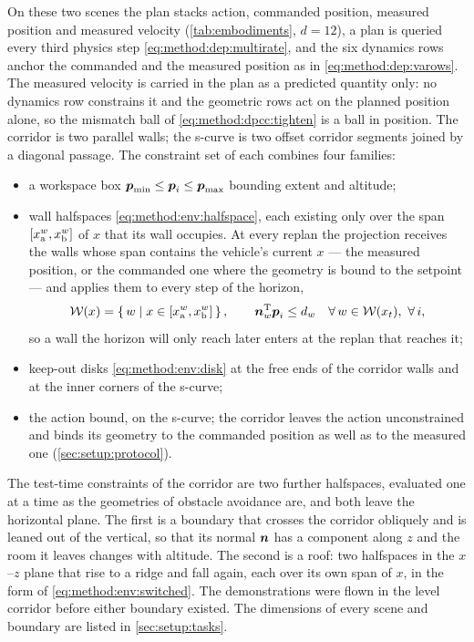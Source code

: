 On these two scenes the plan stacks action, commanded position, measured position and measured velocity
(\autoref{tab:embodiments}, $d = 12$), a plan is queried every third physics step
\eqref{eq:method:dep:multirate}, and the six dynamics rows anchor the commanded and the measured position
as in \eqref{eq:method:dep:varows}. The measured velocity is carried in the plan as a predicted quantity only:
no dynamics row constrains it and the geometric rows act on the planned position alone, so the mismatch ball of
\eqref{eq:method:dpcc:tighten} is a ball in position. The corridor is two parallel walls; the s-curve is two offset corridor
segments joined by a diagonal passage. The constraint set of each combines four families:
\begin{itemize}
  \item a workspace box $\boldsymbol{p}_{\textrm{min}}\le\boldsymbol{p}_{i}\le\boldsymbol{p}_{\textrm{max}}$ bounding extent and
    altitude;
  \item wall halfspaces \eqref{eq:method:env:halfspace}, each existing only over the span
    $[x_{\textrm{a}}^{w},x_{\textrm{b}}^{w}]$ of $x$ that its wall occupies. At every replan the projection receives
    the walls whose span contains the vehicle's current $x$ --- the measured position, or the commanded one
    where the geometry is bound to the setpoint --- and applies them to every step of the horizon,
    \begin{equation}\label{eq:method:env:switched}
      \mathcal{W}(x) = \left\{\,w \;\middle|\; x \in [x_{\textrm{a}}^{w},x_{\textrm{b}}^{w}]\,\right\},
      \qquad
      \boldsymbol{n}_{w}^{\textrm{T}}\boldsymbol{p}_{i} \le d_{w}
      \quad \forall\, w \in \mathcal{W}(x_{t}),\ \forall\, i ,
    \end{equation}
    so a wall the horizon will only reach later enters at the replan that reaches it;
  \item keep-out disks \eqref{eq:method:env:disk} at the free ends of the corridor walls and at the
    inner corners of the s-curve;
  \item the action bound, on the s-curve; the corridor leaves the action unconstrained and binds its
    geometry to the commanded position as well as to the measured one (\autoref{sec:setup:protocol}).
\end{itemize}
The test-time constraints of the corridor are two further halfspaces, evaluated one at a time as the
geometries of obstacle avoidance are, and both leave the horizontal plane. The first is a boundary that
crosses the corridor obliquely and is leaned out of the vertical, so that its normal $\boldsymbol{n}$ has a
component along $z$ and the room it leaves changes with altitude. The second is a roof: two halfspaces
in the $x$--$z$ plane that rise to a ridge and fall again, each over its own span of $x$, in the form of
\eqref{eq:method:env:switched}. The demonstrations were flown in the level corridor before either
boundary existed. The dimensions of every scene and boundary are listed in \autoref{sec:setup:tasks}.

